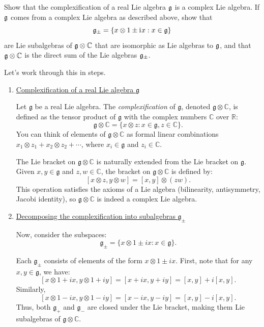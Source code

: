 \documentclass[10pt]{article}
\begin{document}
\begin{example}
	Show that the complexification of a real Lie algebra $\mathfrak{g}$ is a complex Lie algebra. If $\mathfrak{g}$ comes from a complex Lie algebra as described above, show that
	$$
	\mathfrak{g}_\pm = \lbrace x\otimes 1\pm\mathrm{i}\mkern1mu x:x\in\mathfrak{g}\rbrace
	$$
	are Lie subalgebras of $\mathfrak{g}\otimes \mathbb{C}$ that are isomorphic as Lie algebras to $\mathfrak{g}$, and that $\mathfrak{g}\otimes \mathbb{C}$ is the direct sum of the Lie algebras $\mathfrak{g}_\pm$.
\end{example}
\sol Let's work through this in steps.

\begin{enumerate}
	\item \underline{Complexification of a real Lie algebra \(\mathfrak{g}\)}
	
	Let \(\mathfrak{g}\) be a real Lie algebra. The \emph{complexification} of \(\mathfrak{g}\), denoted \(\mathfrak{g} \otimes \mathbb{C}\), is defined as the tensor product of \(\mathfrak{g}\) with the complex numbers \(\mathbb{C}\) over \(\mathbb{R}\):
	$$
	\mathfrak{g} \otimes \mathbb{C} = \{x \otimes z : x \in \mathfrak{g}, z \in \mathbb{C}\}.
	$$
	You can think of elements of \(\mathfrak{g} \otimes \mathbb{C}\) as formal linear combinations \(x_1 \otimes z_1 + x_2 \otimes z_2 + \cdots\), where \(x_i \in \mathfrak{g}\) and \(z_i \in \mathbb{C}\). 
	
	The Lie bracket on \(\mathfrak{g} \otimes \mathbb{C}\) is naturally extended from the Lie bracket on \(\mathfrak{g}\). Given \(x, y \in \mathfrak{g}\) and \(z, w \in \mathbb{C}\), the bracket on \(\mathfrak{g} \otimes \mathbb{C}\) is defined by:
	$$
	[x \otimes z, y \otimes w] = [x, y] \otimes (zw).
	$$
	This operation satisfies the axioms of a Lie algebra (bilinearity, antisymmetry, Jacobi identity), so \(\mathfrak{g} \otimes \mathbb{C}\) is indeed a complex Lie algebra.
	
	\item \underline{Decomposing the complexification into subalgebras $\mathfrak{g}_\pm$}
	
	Now, consider the subspaces:
	$$
	\mathfrak{g}_\pm = \{ x \otimes 1 \pm i x : x \in \mathfrak{g} \}.
	$$
	
	Each \(\mathfrak{g}_\pm\) consists of elements of the form \(x \otimes 1 \pm i x\). First, note that for any \(x, y \in \mathfrak{g}\), we have:
	$$
	[x \otimes 1 + i x, y \otimes 1 + i y] = [x + i x, y + i y] = [x, y] + i [x, y].
	$$
	Similarly,
	$$
	[x \otimes 1 - i x, y \otimes 1 - i y] = [x - i x, y - i y] = [x, y] - i [x, y].
	$$
	Thus, both \(\mathfrak{g}_+\) and \(\mathfrak{g}_-\) are closed under the Lie bracket, making them Lie subalgebras of \(\mathfrak{g} \otimes \mathbb{C}\).
	

\end{enumerate}
\end{document}

